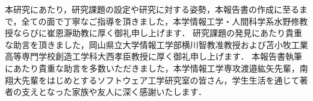 \documentclass[main]{subfiles}
\begin{document}
\acknowledgement

本研究にあたり，研究課題の設定や研究に対する姿勢，本報告書の作成に至るまで，全ての面で丁寧なご指導を頂きました，本学情報工学・人間科学系水野修教授ならびに崔恩瀞助教に厚く御礼申し上げます．
研究課題の発見にあたり貴重な助言を頂きました，岡山県立大学情報工学部横川智教准教授および苫小牧工業高等専門学校創造工学科大西孝臣教授に厚く御礼申し上げます．
本報告書執筆にあたり貴重な助言を多数いただきました，本学情報工学専攻渡邉紘矢先輩，南翔大先輩をはじめとするソフトウェア工学研究室の皆さん，学生生活を通じて著者の支えとなった家族や友人に深く感謝いたします．
\end{document}
